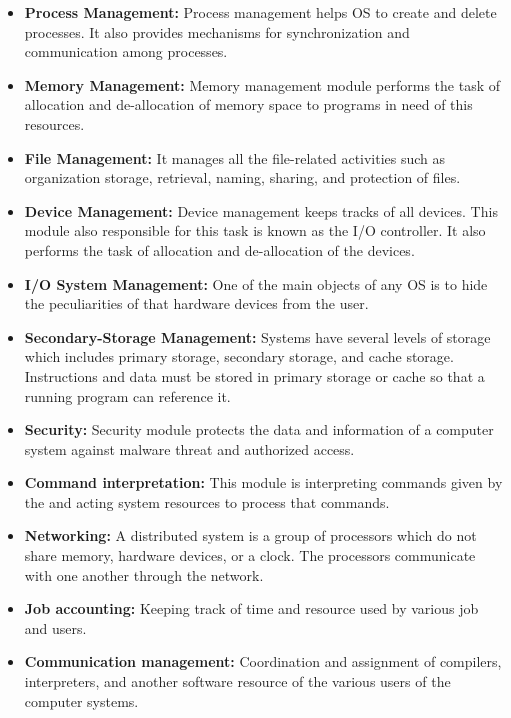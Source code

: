 \documentclass[10pt,a4paper,draft]{article}
\begin{document}
\begin{itemize}

\item \textbf{Process Management:} Process management helps OS to create and delete processes. It also provides mechanisms for synchronization and communication among processes.

\item \textbf{Memory Management:} Memory management module performs the task of allocation and de-allocation of memory space to programs in need of this resources.

\item \textbf{File Management:} It manages all the file-related activities such as organization storage, retrieval, naming, sharing, and protection of files.

\item \textbf{Device Management:} Device management keeps tracks of all devices. This module also responsible for this task is known as the I/O controller. It also performs the task of allocation and de-allocation of the devices.

\item \textbf{I/O System Management:} One of the main objects of any OS is to hide the peculiarities of that hardware devices from the user.

\item \textbf{Secondary-Storage Management:} Systems have several levels of storage which includes primary storage, secondary storage, and cache storage. Instructions and data must be stored in primary storage or cache so that a running program can reference it. 

\item \textbf{Security:} Security module protects the data and information of a computer system against malware threat and authorized access.

\item \textbf{Command interpretation:} This module is interpreting commands given by the and acting system resources to process that commands.

\item \textbf{Networking:} A distributed system is a group of processors which do not share memory, hardware devices, or a clock. The processors communicate with one another through the network.

\item \textbf{Job accounting:} Keeping track of time and resource used by various job and users.

\item \textbf{Communication management:} Coordination and assignment of compilers, interpreters, and another software resource of the various users of the computer systems.

\end{itemize}
\end{document}
